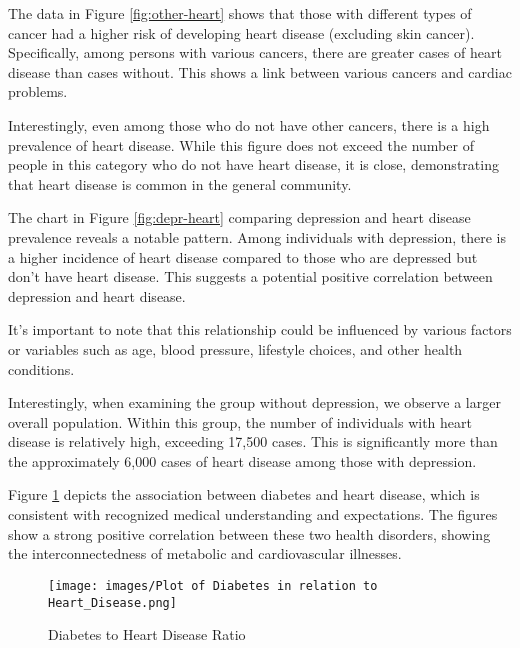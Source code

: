 \documentclass[12pt, a4paper,twoside]{report}
\numberwithin{equation}{chapter}
\begin{document}
The data in Figure \ref{fig:other-heart} shows that those with different types of cancer had a higher risk of developing heart disease (excluding skin cancer). Specifically, among persons with various cancers, there are greater cases of heart disease than cases without. This shows a link between various cancers and cardiac problems.

Interestingly, even among those who do not have other cancers, there is a high prevalence of heart disease. While this figure does not exceed the number of people in this category who do not have heart disease, it is close, demonstrating that heart disease is common in the general community.



The chart in Figure \ref{fig:depr-heart} comparing depression and heart disease prevalence reveals a notable pattern. Among individuals with depression, there is a higher incidence of heart disease compared to those who are depressed but don't have heart disease. This suggests a potential positive correlation between depression and heart disease.

It's important to note that this relationship could be influenced by various factors or variables such as age, blood pressure, lifestyle choices, and other health conditions. 

Interestingly, when examining the group without depression, we observe a larger overall population. Within this group, the number of individuals with heart disease is relatively high, exceeding 17,500 cases. This is significantly more than the approximately 6,000 cases of heart disease among those with depression.

 

Figure \ref{fig:diabetes} depicts the association between diabetes and heart disease, which is consistent with recognized medical understanding and expectations. The figures show a strong positive correlation between these two health disorders, showing the interconnectedness of metabolic and cardiovascular illnesses.

\begin{figure}[htb]
     \centering
     \texttt{[image: images/Plot of Diabetes in relation to Heart\_Disease.png]}
     \caption{Diabetes to Heart Disease Ratio}
     \label{fig:diabetes}
 \end{figure}
\end{document}

